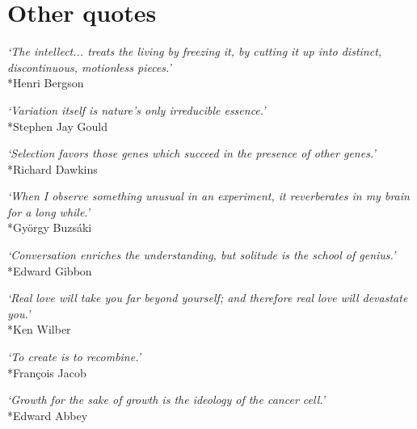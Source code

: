 


\section{Other quotes}


\begin{center}
\textit{`The intellect... treats the living by freezing it, by cutting it up into distinct, discontinuous, motionless pieces.'}\\*Henri Bergson
\end{center}

\begin{center}
\textit{`Variation itself is nature's only irreducible essence.'}\\*Stephen Jay Gould
\end{center}

\begin{center}
\textit{`Selection favors those genes which succeed in the presence of other genes.'}\\*Richard Dawkins
\end{center}

\begin{center}
\textit{`When I observe something unusual in an experiment, it reverberates in my brain for a long while.'}\\*György Buzsáki
\end{center}

\begin{center}
\textit{`Conversation enriches the understanding, but solitude is the school of genius.'}\\*Edward Gibbon
\end{center}

\begin{center}
\textit{`Real love will take you far beyond yourself; and therefore real love will devastate you.'}\\*Ken Wilber
\end{center}

\begin{center}
\textit{`To create is to recombine.'}\\*François Jacob
\end{center}

\begin{center}
\textit{`Growth for the sake of growth is the ideology of the cancer cell.'}\\*Edward Abbey
\end{center}



